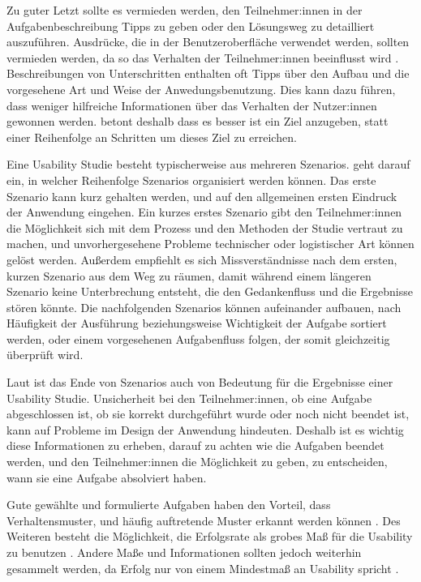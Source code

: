 Zu guter Letzt sollte es vermieden werden, den Teilnehmer:innen in der Aufgabenbeschreibung Tipps zu geben oder den Lösungsweg zu detailliert auszuführen. Ausdrücke, die in der Benutzeroberfläche verwendet werden, sollten vermieden werden, da so das Verhalten der Teilnehmer:innen beeinflusst wird \parencite{mccloskeyTaskScenarios2014, barnumUsabilityTesting2021}. Beschreibungen von Unterschritten enthalten oft Tipps über den Aufbau und die vorgesehene Art und Weise der Anwedungsbenutzung. Dies kann dazu führen, dass weniger hilfreiche Informationen über das Verhalten der Nutzer:innen gewonnen werden. \textcite{barnumUsabilityTesting2021} betont deshalb dass es besser ist ein Ziel anzugeben, statt einer Reihenfolge an Schritten um dieses Ziel zu erreichen.
\parencite{mccloskeyTaskScenarios2014}

Eine Usability Studie besteht typischerweise aus mehreren Szenarios. \textcite{barnumUsabilityTesting2021} geht darauf ein, in welcher Reihenfolge Szenarios organisiert werden können. Das erste Szenario kann kurz gehalten werden, und auf den allgemeinen ersten Eindruck der Anwendung eingehen. Ein kurzes erstes Szenario gibt den Teilnehmer:innen die Möglichkeit sich mit dem Prozess und den Methoden der Studie vertraut zu machen, und unvorhergesehene Probleme technischer oder logistischer Art können gelöst werden. Außerdem empfiehlt es sich Missverständnisse nach dem ersten, kurzen Szenario aus dem Weg zu räumen, damit während einem längeren Szenario keine Unterbrechung entsteht, die den Gedankenfluss und die Ergebnisse stören könnte. Die nachfolgenden Szenarios können aufeinander aufbauen, nach Häufigkeit der Ausführung beziehungsweise Wichtigkeit der Aufgabe sortiert werden, oder einem vorgesehenen Aufgabenfluss folgen, der somit gleichzeitig überprüft wird.
\parencite{barnumUsabilityTesting2021}

Laut \textcite{barnumUsabilityTesting2021} ist das Ende von Szenarios auch von Bedeutung für die Ergebnisse einer Usability Studie. Unsicherheit bei den Teilnehmer:innen, ob eine Aufgabe abgeschlossen ist, ob sie korrekt durchgeführt wurde oder noch nicht beendet ist, kann auf Probleme im Design der Anwendung hindeuten. Deshalb ist es wichtig diese Informationen zu erheben, darauf zu achten wie die Aufgaben beendet werden, und den Teilnehmer:innen die Möglichkeit zu geben, zu entscheiden, wann sie eine Aufgabe absolviert haben.
\parencite{barnumUsabilityTesting2021}

Gute gewählte und formulierte Aufgaben haben den Vorteil, dass Verhaltensmuster, und häufig auftretende Muster erkannt werden können \parencite{barnumUsabilityTesting2021}. Des Weiteren besteht die Möglichkeit, die Erfolgsrate als grobes Maß für die Usability zu benutzen \parencite{nielsenSuccessRate2001}. Andere Maße und Informationen sollten jedoch weiterhin gesammelt werden, da Erfolg nur von einem Mindestmaß an Usability spricht \parencite{nielsenSuccessRate2001}.
